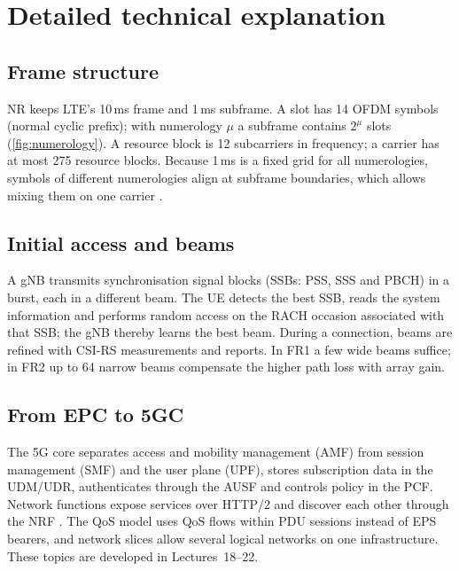 \documentclass[11pt,a4paper]{article}
\begin{document}
\begin{acnfigure}
  \caption{Non-standalone EN-DC (option 3x) with the EPC, and standalone NR (option 2) with the 5GC.}
  \label{fig:options}
\end{acnfigure}

\section{Detailed technical explanation}

\subsection{Frame structure}
NR keeps LTE's 10\,ms frame and 1\,ms subframe. A slot has 14 OFDM symbols (normal cyclic prefix); with
numerology $\mu$ a subframe contains $2^\mu$ slots (\cref{fig:numerology}). A resource block is 12 subcarriers
in frequency; a carrier has at most 275 resource blocks. Because 1\,ms is a fixed grid for all numerologies,
symbols of different numerologies align at subframe boundaries, which allows mixing them on one carrier
\cite{ts38211}.

\begin{acnfigure}
  \caption{Slots per 1\,ms subframe for numerologies $\mu = 0$--3.}
  \label{fig:numerology}
\end{acnfigure}

\subsection{Initial access and beams}
A gNB transmits synchronisation signal blocks (SSBs: PSS, SSS and PBCH) in a burst, each in a different beam.
The UE detects the best SSB, reads the system information and performs random access on the RACH occasion
associated with that SSB; the gNB thereby learns the best beam. During a connection, beams are refined with
CSI-RS measurements and reports. In FR1 a few wide beams suffice; in FR2 up to 64 narrow beams compensate the
higher path loss with array gain.

\subsection{From EPC to 5GC}
The 5G core separates access and mobility management (AMF) from session management (SMF) and the user plane
(UPF), stores subscription data in the UDM/UDR, authenticates through the AUSF and controls policy in the PCF.
Network functions expose services over HTTP/2 and discover each other through the NRF \cite{ts23501}. The QoS
model uses QoS flows within PDU sessions instead of EPS bearers, and network slices allow several logical
networks on one infrastructure. These topics are developed in Lectures~18--22.
\end{document}
